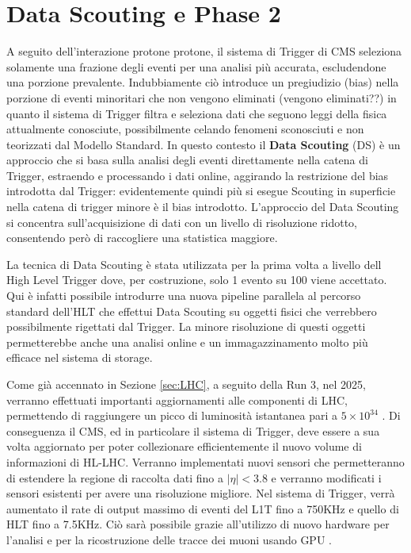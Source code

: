 \section{Data Scouting e Phase 2}
\label{sec:DataScouting}


A seguito dell'interazione protone protone, il sistema di Trigger di CMS seleziona solamente una frazione degli eventi per una analisi più accurata, escludendone una porzione prevalente. Indubbiamente ciò introduce un pregiudizio (bias) nella porzione di eventi minoritari che non vengono eliminati (vengono eliminati??) in quanto il sistema di Trigger filtra e seleziona dati che seguono leggi della fisica attualmente conosciute, possibilmente celando fenomeni sconosciuti e non teorizzati dal Modello Standard. \newline
In questo contesto il \textbf{ Data Scouting} (DS) è un approccio che si basa sulla analisi degli eventi direttamente nella catena di Trigger, estraendo e processando i dati online, aggirando la restrizione del bias introdotta dal Trigger: evidentemente quindi più si esegue Scouting in superficie nella catena di trigger minore è il bias introdotto. L'approccio del Data Scouting si concentra sull'acquisizione di dati con un livello di risoluzione ridotto, consentendo però di raccogliere una statistica maggiore.

La tecnica di Data Scouting è stata utilizzata per la prima volta a livello dell High Level Trigger dove, per costruzione, solo 1 evento su 100 viene accettato. Qui è infatti possibile introdurre una nuova pipeline parallela al percorso standard dell'HLT che effettui Data Scouting su oggetti fisici che verrebbero possibilmente rigettati dal Trigger. La minore risoluzione di questi oggetti permetterebbe anche una analisi online e un immagazzinamento molto più efficace nel sistema di storage. 

Come già accennato in Sezione \ref{sec:LHC}, a seguito della Run 3, nel 2025, verranno effettuati importanti aggiornamenti alle componenti di LHC, permettendo di raggiungere un picco di luminosità istantanea pari a $5 \times 10^{34}$ \Lumi. Di conseguenza il CMS, ed in particolare il sistema di Trigger, deve essere a sua volta aggiornato per poter collezionare efficientemente il nuovo volume di informazioni di HL-LHC. Verranno implementati nuovi sensori che permetteranno di estendere la regione di raccolta dati fino a $|\eta| < 3.8$ e verranno modificati i sensori esistenti per avere una risoluzione migliore. Nel sistema di Trigger, verrà aumentato il rate di output massimo di eventi del L1T fino a 750KHz e quello di HLT fino a 7.5KHz. Ciò sarà possibile grazie all'utilizzo di nuovo hardware per l'analisi e per la ricostruzione delle tracce dei muoni usando GPU \cite{collaboration2021phase}.

